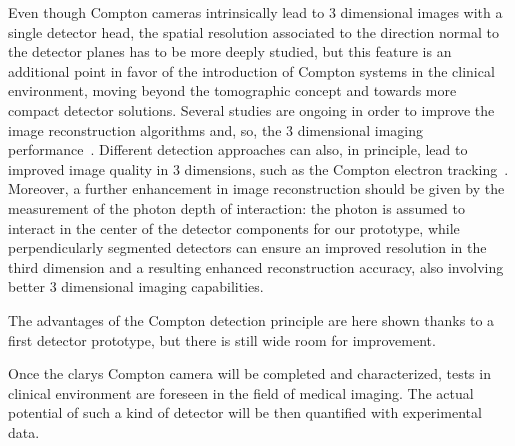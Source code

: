 Even though Compton cameras intrinsically lead to 3 dimensional images with a single detector head, the spatial resolution associated to the direction normal to the detector planes has to be more deeply studied, but this feature is an additional point in favor of the introduction of Compton systems in the clinical environment, moving beyond the tomographic concept and towards more compact detector solutions. Several studies are ongoing in order to improve the image reconstruction algorithms and, so, the 3 dimensional imaging performance~\parencite{Kuchment2016}. Different detection approaches can also, in principle, lead to improved image quality in 3 dimensions, such as the Compton electron tracking~\parencite{Sonoda2015, Kabuki2007}. Moreover, a further enhancement in image reconstruction should be given by the measurement of the photon depth of interaction: the photon is assumed to interact in the center of the detector components for our prototype, while perpendicularly segmented detectors can ensure an improved resolution in the third dimension and a resulting enhanced reconstruction accuracy, also involving better 3 dimensional imaging capabilities. 

The advantages of the Compton detection principle are here shown thanks to a first detector prototype, but there is still wide room for improvement.       

Once the \gls{clarys} Compton camera will be completed and characterized, tests in clinical environment are foreseen in the field of medical imaging. The actual potential of such a kind of detector will be then quantified with experimental data.

\clearpage
